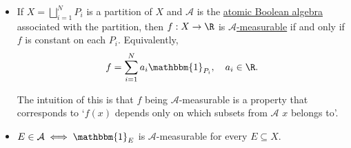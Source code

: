 \documentclass{article}
\newcommand{\1}[1]{\mathbbm{1}_{#1}}
\begin{document}
\begin{remark}
    \leavevmode
    \begin{itemize}
        \item If $X = \bigsqcup_{i=1}^N P_i$ is a partition of $X$ and $\mathcal{A}$ is the \hyperlink{def:atomicBooleanAlgebra}{atomic Boolean algebra} associated with the partition, then $f:X \to \R$ is \hyperlink{def:measurableFunctoR}{$\mathcal{A}$-measurable} if and only if $f$ is constant on each $P_i$.
            Equivalently,
            \begin{equation*}
                f = \sum_{i=1}^N a_i \1{P_i},\quad a_i \in \R.
            \end{equation*}

            The intuition of this is that $f$ being $\mathcal{A}$-measurable is a property that corresponds to `$f(x)$ depends only on which subsets from $\mathcal{A}$ $x$ belongs to'.
        \item $E \in \mathcal{A} \iff \1{E}$ is $\mathcal{A}$-measurable for every $E \subseteq X$.
    \end{itemize}
\end{remark}

\end{document}
